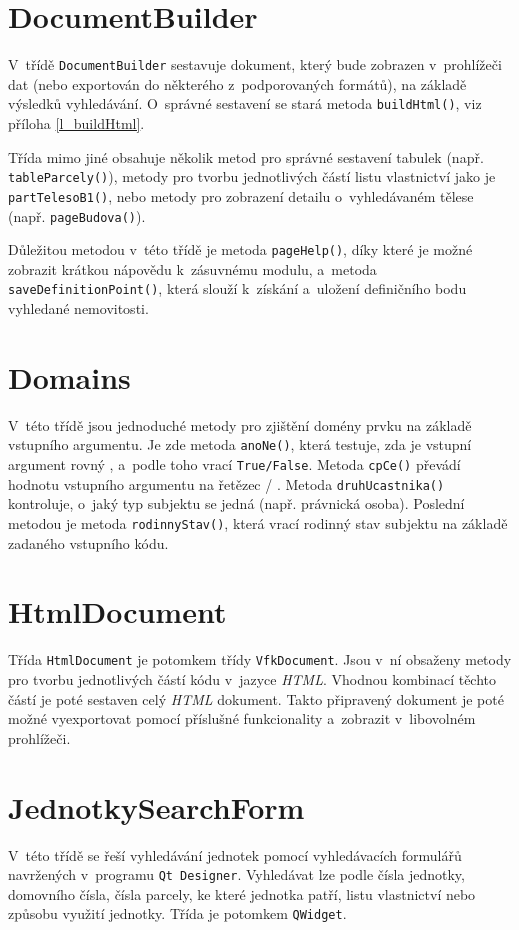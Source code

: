 \documentclass[a4paper,12pt,oneside]{book}
\begin{document}
\section{DocumentBuilder}
V~třídě \texttt{DocumentBuilder} sestavuje dokument, který bude
zobrazen v~prohlížeči dat (nebo exportován do některého
z~podporovaných formátů), na základě výsledků vyhledávání. O~správné
sestavení se stará metoda \texttt{buildHtml()}, viz příloha
\ref{l_buildHtml}.

Třída mimo jiné obsahuje několik metod pro správné sestavení tabulek
(např. \texttt{tableParcely()}), metody pro tvorbu jednotlivých částí
listu vlastnictví jako je \texttt{partTelesoB1()}, nebo metody pro
zobrazení detailu o~vyhledávaném tělese (např. \texttt{pageBudova()}).

Důležitou metodou v~této třídě je metoda \texttt{pageHelp()}, díky
které je možné zobrazit krátkou nápovědu k~zásuvnému modulu, a~metoda
\texttt{saveDefinitionPoint()}, která slouží
k~získání a~uložení definičního bodu vyhledané nemovitosti.

\section{Domains}
V~této třídě jsou jednoduché metody pro zjištění domény prvku na
základě vstupního argumentu. Je zde metoda \texttt{anoNe()}, která
testuje, zda je vstupní argument rovný , a~podle toho vrací
\texttt{True/False}. Metoda \texttt{cpCe()} převádí hodnotu
vstupního argumentu na řetězec  / . Metoda \texttt{druhUcastnika()} kontroluje, o~jaký
typ subjektu se jedná (např. právnická osoba). Poslední metodou je
metoda \texttt{rodinnyStav()}, která vrací rodinný stav subjektu na
základě zadaného vstupního kódu.

\section{HtmlDocument}

Třída \texttt{HtmlDocument} je potomkem třídy \texttt{VfkDocument}. 
Jsou v~ní obsaženy metody pro tvorbu
jednotlivých částí kódu v~jazyce \textit{HTML}. Vhodnou kombinací
těchto částí je poté sestaven celý \textit{HTML} dokument. Takto
připravený dokument je poté možné vyexportovat pomocí příslušné
funkcionality a~zobrazit v~libovolném prohlížeči.

\section{JednotkySearchForm}
V~této třídě se řeší vyhledávání jednotek pomocí vyhledávacích
formulářů navržených v~programu \texttt{Qt Designer}. Vyhledávat lze
podle čísla jednotky, domovního čísla, čísla parcely, ke které
jednotka patří, listu vlastnictví nebo způsobu využití jednotky. Třída
je potomkem \texttt{QWidget}.
\end{document}

